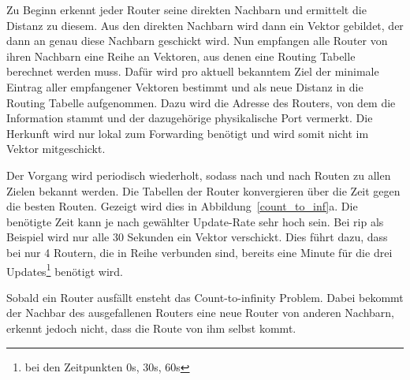 \documentclass[11pt,a4paper,final]{article}
\begin{document}
Zu Beginn erkennt jeder Router seine direkten Nachbarn und ermittelt die Distanz zu diesem. Aus den direkten Nachbarn wird dann ein Vektor gebildet, der dann an genau diese Nachbarn geschickt wird. Nun empfangen alle Router von ihren Nachbarn eine Reihe an Vektoren, aus denen eine Routing Tabelle berechnet werden muss. Dafür wird pro aktuell bekanntem Ziel der minimale Eintrag aller empfangener Vektoren bestimmt und als neue Distanz in die Routing Tabelle aufgenommen. Dazu wird die Adresse des Routers, von dem die Information stammt und der dazugehörige physikalische Port vermerkt. Die Herkunft wird nur lokal zum Forwarding benötigt und wird somit nicht im Vektor mitgeschickt.

Der Vorgang wird periodisch wiederholt, sodass nach und nach Routen zu allen Zielen bekannt werden. Die Tabellen der Router konvergieren über die Zeit gegen die besten Routen. Gezeigt wird dies in Abbildung~\ref{count_to_inf}a. Die benötigte Zeit kann je nach gewählter Update-Rate sehr hoch sein. Bei \ac{rip} als Beispiel wird nur alle 30 Sekunden ein Vektor verschickt. Dies führt dazu, dass bei nur 4 Routern, die in Reihe verbunden sind, bereits eine Minute für  die drei Updates\footnote{bei den Zeitpunkten 0s, 30s, 60s} benötigt wird.

Sobald ein Router ausfällt ensteht das Count-to-infinity Problem.
Dabei bekommt der Nachbar des ausgefallenen Routers eine neue Router von anderen Nachbarn, erkennt jedoch nicht, dass die Route von ihm selbst kommt.
\end{document}
